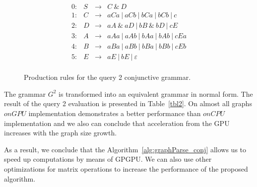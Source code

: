 \begin{figure}[h]
    \[
    \begin{array}{rccl}
    0: & S & \rightarrow & C ~\& ~ D \\ 
    1: & C & \rightarrow & aCa~|~aCb~|~bCa~|~bCb~|~c\\ 
    2: & D & \rightarrow & aA ~\& ~aD~|~bB ~\& ~bD~|~cE \\ 
    3: & A & \rightarrow & aAa~|~aAb~|~bAa~|~bAb~|~cEa\\ 
    4: & B & \rightarrow & aBa~|~aBb~|~bBa~|~bBb~|~cEb \\
    5: & E & \rightarrow & aE~|~bE~|~\varepsilon \\ 
    \end{array}
    \]
    \caption{Production rules for the query 2 conjunctive grammar.}
    \label{ProductionRulesQuery2}
\end{figure}

The grammar $G^2$ is transformed into an equivalent grammar in normal form. The result of the query 2 evaluation is presented in Table~\ref{tbl2}. On almost all graphs $onGPU$ implementation demonstrates a better performance than $onCPU$ implementation and we also can conclude that acceleration from the GPU increases with the graph size growth.

As a result, we conclude that the Algorithm~\ref{alg:graphParse_conj} allows us to speed up computations by means of GPGPU. We can also use other optimizations for matrix operations to increase the performance of the proposed algorithm.
